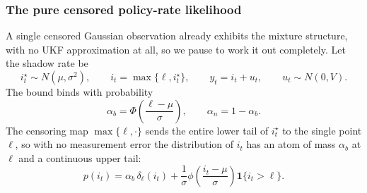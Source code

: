 \documentclass[11pt]{article}
\begin{document}
\subsubsection{The pure censored policy-rate likelihood}
\label{sec:ukf-censored}

A single censored Gaussian observation already exhibits the mixture
structure, with no UKF approximation at all, so we pause to work it out
completely. Let the shadow rate be
\begin{equation}\label{eq:29}
 i_t^\star\sim N(\mu,\sigma^2),
 \qquad i_t=\max\{\ell,i_t^\star\},
 \qquad y_t=i_t+u_t,
 \qquad u_t\sim N(0,V).
\end{equation}
The bound binds with probability
\begin{equation}\label{eq:30}
 \alpha_b=\Phi\!\left(\frac{\ell-\mu}{\sigma}\right),
 \qquad
 \alpha_n=1-\alpha_b.
\end{equation}
The censoring map $\max\{\ell,\cdot\}$ sends the entire lower tail of
$i_t^\star$ to the single point $\ell$, so with no measurement error the
distribution of $i_t$ has an atom of mass $\alpha_b$ at $\ell$ and a
continuous upper tail:
\begin{equation}\label{eq:31}
 p(i_t)=\alpha_b\,\delta_\ell(i_t)
 +\frac{1}{\sigma}\phi\!\left(\frac{i_t-\mu}{\sigma}\right)
  \mathbf 1\{i_t>\ell\}.
\end{equation}
\end{document}
